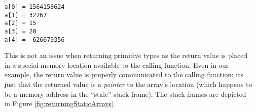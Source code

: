 \begin{verbatim}
a[0] = 1564158624
a[1] = 32767
a[2] = 15
a[3] = 20
a[4] = -626679356
\end{verbatim}

This is not an issue when returning primitive types as 
the return value is placed in a special memory location 
available to the calling function.  Even in our example, the
return value is properly communicated to the calling function:
its just that the returned value is a \emph{pointer} to the array's
location (which happens to be a memory address in the 
``stale'' stack frame).  The stack frames are depicted in Figure 
\ref{fig:returningStaticArrays}.

\begin{figure}[H]
\centering
{}


\end{figure}
